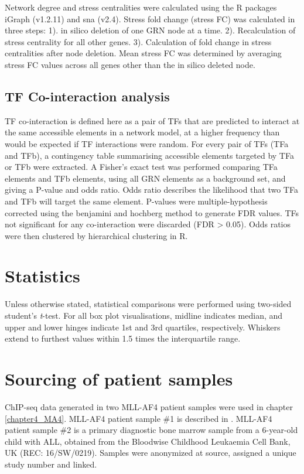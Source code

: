 Network degree and stress centralities were calculated using the R packages iGraph (v1.2.11) and sna (v2.4). Stress fold change (stress FC) was calculated in three steps: 1). in silico deletion of one GRN node at a time. 2). Recalculation of stress centrality for all other genes. 3). Calculation of fold change in stress centralities after node deletion. Mean stress FC was determined by averaging stress FC values across all genes other than the in silico deleted node.

\subsection{\label{ch2:coint-methods}TF Co-interaction analysis}

TF co-interaction is defined here as a pair of TFs that are predicted to interact at the same accessible elements in a network model, at a higher frequency than would be expected if TF interactions were random. For every pair of TFs (TFa and TFb), a contingency table summarising accessible elements targeted by TFa or TFb were extracted. A Fisher's exact test was performed comparing TFa elements and TFb elements, using all GRN elements as a background set, and giving a P-value and odds ratio. Odds ratio describes the likelihood that two TFa and TFb will target the same element. P-values were multiple-hypothesis corrected using the benjamini and hochberg method to generate FDR values. TFs not significant for any co-interaction were discarded (FDR > 0.05). Odds ratios were then clustered by hierarchical clustering in R. 

\section{Statistics}

Unless otherwise stated, statistical comparisons were performed using two-sided student's \textit{t}-test. For all box plot visualisations, midline indicates median, and upper and lower hinges indicate 1st and 3rd quartiles, respectively. Whiskers extend to furthest values within 1.5 times the interquartile range.

\section{Sourcing of patient samples}
ChIP-seq data generated in two MLL-AF4 patient samples were used in chapter \ref{chapter4_MA4}. MLL-AF4 patient sample \#1 is described in \cite{kerry_mll-af4_2017}. MLL-AF4 patient sample \#2 is a primary diagnostic bone marrow sample from a 6-year-old child with ALL, obtained from the Bloodwise Childhood Leukaemia Cell Bank, UK (REC: 16/SW/0219). Samples were anonymized at source, assigned a unique study number and linked.

